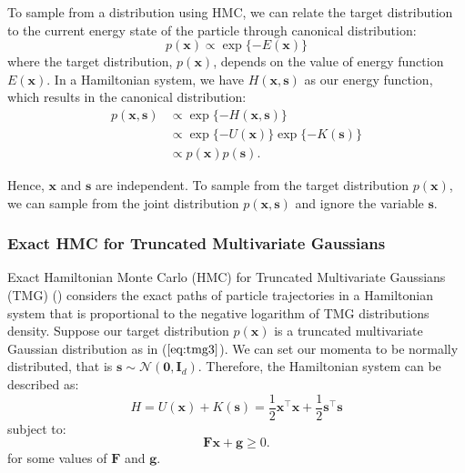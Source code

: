 \documentclass{scrartcl}
\numberwithin{equation}{section}
\begin{document}
To sample from a distribution using HMC, we can relate the target distribution to the current energy state of the particle through canonical distribution:
\begin{equation}\label{eq:can}
	p(\textbf{x}) \propto \exp\{-E(\textbf{x})\}
\end{equation}
where the target distribution, $p(\textbf{x})$, depends on the value of energy function $E(\textbf{x})$. In a Hamiltonian system, we have $H(\textbf{x}, \textbf{s})$ as our energy function, which results in the canonical distribution:
\begin{equation}\label{eq:can2}
\begin{split}
	p(\textbf{x}, \textbf{s}) &\propto \exp\{-H(\textbf{x}, \textbf{s})\} \\
	&\propto \exp\{-U(\textbf{x})\} \exp\{-K(\textbf{s})\} \\
	&\propto p(\textbf{x})p(\textbf{s}).
\end{split}
\end{equation}

Hence, $\textbf{x}$ and $\textbf{s}$ are independent. To sample from the target distribution $p(\textbf{x})$, we can sample from the joint distribution $p(\textbf{x}, \textbf{s})$ and ignore the variable $\textbf{s}$.  

\subsubsection{Exact HMC for Truncated Multivariate Gaussians}
Exact Hamiltonian Monte Carlo (HMC) for Truncated Multivariate Gaussians (TMG) (\cite{pakman2013exact}) considers the exact paths of particle trajectories in a Hamiltonian system that is proportional to the negative logarithm of TMG distributions density. Suppose our target distribution $p(\textbf{x})$ is a truncated multivariate Gaussian distribution as in ($\ref{eq:tmg3}$). We can set our momenta to be normally distributed, that is $\textbf{s} \sim \mathcal{N}(\textbf{0}, \textbf{I}_d)$. Therefore, the Hamiltonian system can be described as: 
\begin{equation}\label{eq:hsys}
	H = U(\textbf{x}) + K(\textbf{s}) = \frac{1}{2}\textbf{x}^{\intercal}\textbf{x} + \frac{1}{2}\textbf{s}^{\intercal}\textbf{s}
\end{equation}
subject to:  
\begin{equation}\label{eq:st}
	\textbf{F}\textbf{x} + \textbf{g} \geq 0.
\end{equation}
for some values of $\textbf{F}$ and $\textbf{g}$.   
\end{document}

